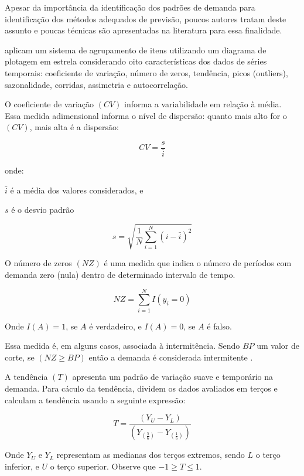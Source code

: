 \documentclass[11pt,letterpaper,twocolumn]{article}
\begin{document}
Apesar da importância da identificação dos padrões de demanda para identificação dos métodos adequados de previsão, poucos autores tratam deste assunto e poucas técnicas são apresentadas na literatura para essa finalidade.

\cite{BusingerRead1999} aplicam um sistema de agrupamento de itens utilizando um diagrama de plotagem em estrela considerando oito características dos dados de séries temporais: coeficiente de variação, número de zeros, tendência, picos (outliers), sazonalidade, corridas, assimetria e autocorrelação.

O coeficiente de variação $(CV)$ informa a variabilidade em relação à média. Essa medida adimensional informa o nível de dispersão: quanto mais alto for o $(CV)$, mais alta é a dispersão:

\begin{equation}
CV = \frac{s}{\bar{i}}
\end{equation}

onde: 

$\bar{i}$ é a média dos valores considerados, e

$s$ é o desvio padrão 

\begin{equation}
s = \sqrt{ \frac{1}{N} \sum_{i=1}^{N}{(i-\bar{i})^2}}
\end{equation}

O número de zeros $(NZ)$ é uma medida que indica o número de períodos com demanda zero (nula) dentro de determinado intervalo de tempo. 

\begin{equation}
NZ = \sum_{i=1}^{N}{I(y_i=0)}
\end{equation}

Onde $I(A)=1$, se $A$ é verdadeiro, e $I(A)=0$, se $A$ é falso.

Essa medida é, em alguns casos, associada à intermitência. Sendo $BP$ um valor de corte, se $(NZ\geq BP)$ então a demanda é considerada intermitente \citep{BoylanEtAl2008}.

A tendência $(T)$ apresenta um padrão de variação suave e temporário na demanda. Para cáculo da tendência, \cite{BusingerRead1999} dividem os dados avaliados em terços e calculam a tendência usando a seguinte expressão:

\begin{equation}
T = \frac{(Y_U - Y_L)}{(Y_{(\frac{5}{6})} - Y_{(\frac{1}{6})})}
\end{equation}

Onde $Y_U$ e $Y_L$ representam as medianas dos terços extremos, sendo $L$ o terço inferior, e $U$ o terço superior. Observe que $-1 \geq T \leq 1$.
\end{document}
